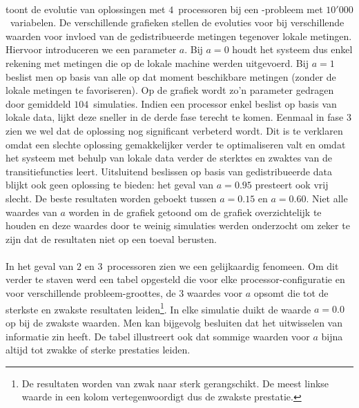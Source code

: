 \paragraph{}
 toont de evolutie van oplossingen met $4$~processoren bij een -probleem met $10'000$~variabelen. De verschillende grafieken stellen de evoluties voor bij verschillende waarden voor invloed van de gedistribueerde metingen tegenover lokale metingen. Hiervoor introduceren we een parameter $a$. Bij $a=0$ houdt het systeem dus enkel rekening met metingen die op de lokale machine werden uitgevoerd. Bij $a=1$ beslist men op basis van alle op dat moment beschikbare metingen (zonder de lokale metingen te favoriseren). Op de grafiek wordt zo'n parameter gedragen door gemiddeld $104$~simulaties. Indien een processor enkel beslist op basis van lokale data, lijkt deze sneller in de derde fase terecht te komen. Eenmaal in fase $3$ zien we wel dat de oplossing nog significant verbeterd wordt. Dit is te verklaren omdat een slechte oplossing gemakkelijker verder te optimaliseren valt en omdat het systeem met behulp van lokale data verder de sterktes en zwaktes van de transitiefuncties leert. Uitsluitend beslissen op basis van gedistribueerde data blijkt ook geen oplossing te bieden: het geval van $a=0.95$ presteert ook vrij slecht. De beste resultaten worden geboekt tussen $a=0.15$ en $a=0.60$. Niet alle waardes van $a$ worden in de grafiek getoond om de grafiek overzichtelijk te houden en deze waardes door te weinig simulaties werden onderzocht om zeker te zijn dat de resultaten niet op een toeval berusten.

\paragraph{}

In het geval van $2$ en $3$~processoren zien we een gelijkaardig fenomeen. Om dit verder te staven werd een tabel opgesteld die voor elke processor-configuratie en voor verschillende probleem-groottes, de $3$ waardes voor $a$ opsomt die tot de sterkste en zwakste resultaten leiden\footnote{De resultaten worden van zwak naar sterk gerangschikt. De meest linkse waarde in een kolom vertegenwoordigt dus de zwakste prestatie.}. In elke simulatie duikt de waarde $a=0.0$ op bij de zwakste waarden. Men kan bijgevolg besluiten dat het uitwisselen van informatie zin heeft. De tabel illustreert ook dat sommige waarden voor $a$ bijna altijd tot zwakke of sterke prestaties leiden.

